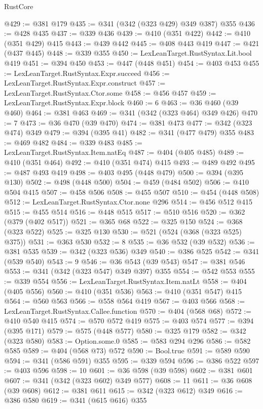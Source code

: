 \begin{lexlean}{RustCore}
\begin{coremodule}
@429 := @381 @179
@435 := @341 (@342 (@323 @429) @349 @387) @355
@436 := @428 @435
@437 := @339 @436
@439 := @410 (@351 @422)
@442 := @410 (@351 @429) @415
@443 := @439 @442
@445 := @408 @443 @419
@447 := @421 (@437 @445)
@448 := @339 @355
@450 := LexLeanTarget.RustSyntax.Lit.bool @419
@451 := @394 @450
@453 := @447 (@448 @451)
@454 := @403 @453
@455 := LexLeanTarget.RustSyntax.Expr.succeed
@456 := LexLeanTarget.RustSyntax.Expr.construct
@457 := LexLeanTarget.RustSyntax.Ctor.some
@458 := @456 @457
@459 := LexLeanTarget.RustSyntax.Expr.block
@460 := 6
@463 := @36 @460 (@39 @460)
@464 := @381 @463
@469 := @341 (@342 (@323 @464) @349 @426)
@470 := 7
@473 := @36 @470 (@39 @470)
@474 := @381 @473
@477 := @342 (@323 @474) @349
@479 := @394 (@395 @41)
@482 := @341 (@477 @479) @355
@483 := @469 @482
@484 := @339 @483
@485 := LexLeanTarget.RustSyntax.Item.natEq
@487 := @404 (@405 @485)
@489 := @410 (@351 @464)
@492 := @410 (@351 @474) @415
@493 := @489 @492
@495 := @487 @493 @419
@498 := @403 @495 (@448 @479)
@500 := @394 (@395 @130)
@502 := @498 (@448 @500)
@504 := @459 (@484 @502)
@506 := @410 @504 @415
@507 := @458 @506
@508 := @455 @507
@510 := @454 (@448 @508)
@512 := LexLeanTarget.RustSyntax.Ctor.none @296
@514 := @456 @512 @415
@515 := @455 @514
@516 := @448 @515
@517 := @510 @516
@520 := @362 (@379 (@402 @517))
@521 := @365 @68
@522 := @325 @150
@524 := @368 (@323 @522)
@525 := @325 @130
@530 := @521 (@524 (@368 (@323 @525) @375))
@531 := @363 @530
@532 := 8
@535 := @36 @532 (@39 @532)
@536 := @381 @535
@539 := @342 (@323 @536) @349
@540 := @386 @525
@542 := @341 (@539 @540)
@543 := 9
@546 := @36 @543 (@39 @543)
@547 := @381 @546
@553 := @341 (@342 (@323 @547) @349 @397) @355
@554 := @542 @553
@555 := @339 @554
@556 := LexLeanTarget.RustSyntax.Item.natLt
@558 := @404 (@405 @556)
@560 := @410 (@351 @536)
@563 := @410 (@351 @547) @415
@564 := @560 @563
@566 := @558 @564 @419
@567 := @403 @566
@568 := LexLeanTarget.RustSyntax.Callee.function
@570 := @404 (@568 @68)
@572 := @410 @540 @415
@574 := @570 @572 @419
@575 := @403 @574
@577 := @394 (@395 @171)
@579 := @575 (@448 @577)
@580 := @325 @179
@582 := @342 (@323 @580)
@583 := Option.some.{0}
@585 := @583 @294 @296
@586 := @582 @585
@589 := @404 (@568 @73) @572
@590 := Bool.true
@591 := @589 @590
@594 := @341 (@586 @591) @355
@595 := @339 @594
@596 := @386 @522
@597 := @403 @596
@598 := 10
@601 := @36 @598 (@39 @598)
@602 := @381 @601
@607 := @341 (@342 (@323 @602) @349 @577)
@608 := 11
@611 := @36 @608 (@39 @608)
@612 := @381 @611
@615 := @342 (@323 @612) @349
@616 := @386 @580
@619 := @341 (@615 @616) @355

\end{coremodule}
\end{lexlean}
